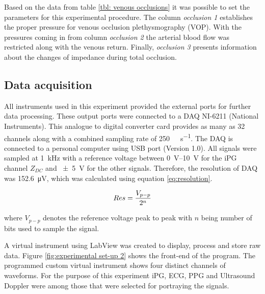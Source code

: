 Based on the data from table \ref{tbl: venous occlusions} it was possible to set the parameters for this experimental procedure. The column \textit{occlusion 1} establishes the proper pressure for venous occlusion plethysmography (VOP). With the pressures coming in from column \textit{occlusion 2} the arterial blood flow was restricted along with the venous return. Finally, \textit{occlusion 3} presents information about the changes of impedance during total occlusion.

\subsection{Data acquisition}
\label{section procedure 1.4}

All instruments used in this experiment provided the external ports for further data processing. These output ports were connected to a DAQ NI-6211 (National Instruments). This analogue to digital converter card provides as many as 32 channels along with a combined sampling rate of \SI{250}{\kilo\sample\per\second}. The DAQ is connected to a personal computer using USB port (Version 1.0). All signals were sampled at \SI{1}{\kilo\hertz} with a reference voltage between \SIrange{0}{10}{\volt} for the iPG channel $Z_{DC}$ and \SI{\pm 5}{\volt} for the other signals. Therefore, the resolution of DAQ was \SI{152.6}{\micro\volt}, which was calculated using equation \ref{eq:resolution}. 

\begin{align}
	\label{eq:resolution}
	Res =\frac{V_{p-p}}{2^{n}}		\tagaddtext{[\si{\volt}]}
\end{align}

where $V_{p-p}$ denotes the reference voltage peak to peak with $n$ being number of bits used to sample the signal. 

A virtual instrument using LabView \cite{LabView:2016} was created to display, process and store raw data. Figure \ref{fig:experimental set-up 2} shows the front-end of the program. The programmed custom virtual instrument shows four distinct channels of waveforms. For the purpose of this experiment iPG, ECG, PPG and Ultrasound Doppler were among those that were selected for portraying the signals.

